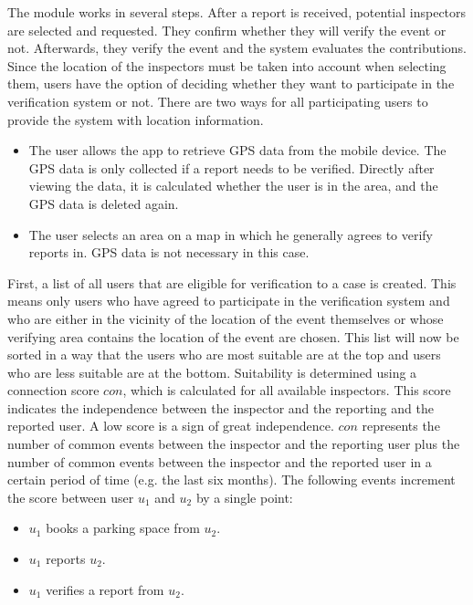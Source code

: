 The module works in several steps. After a report is received, potential inspectors are selected and requested. They confirm whether they will verify the event or not. Afterwards, they verify the event and the system evaluates the contributions. \\

Since the location of the inspectors must be taken into account when selecting them, users have the option of deciding whether they want to participate in the verification system or not. There are two ways for all participating users to provide the system with location information. 
\begin{itemize}
\item The user allows the app to retrieve GPS data from the mobile device. The GPS data is only collected if a report needs to be verified. Directly after viewing the data, it is calculated whether the user is in the area, and the GPS data is deleted again.
\item The user selects an area on a map in which he generally agrees to verify reports in. GPS data is not necessary in this case.
\end{itemize}

First, a list of all users that are eligible for verification to a case is created. This means only users who have agreed to participate in the verification system and who are either in the vicinity of the location of the event themselves or whose verifying area contains the location of the event are chosen. This list will now be sorted in a way that the users who are most suitable are at the top and users who are less suitable are at the bottom. Suitability is determined using a connection score $con$, which is calculated for all available inspectors. This score indicates the independence between the inspector and the reporting and the reported user. A low score is a sign of great independence. $con$ represents the number of common events between the inspector and the reporting user plus the number of common events between the inspector and the reported user in a certain period of time (e.g. the last six months). The following events increment the score between user $u_1$ and $u_2$ by a single point:
\begin{itemize}
\item $u_1$ books a parking space from $u_2$.
\item $u_1$ reports $u_2$.
\item $u_1$ verifies a report from $u_2$.
\end{itemize}

